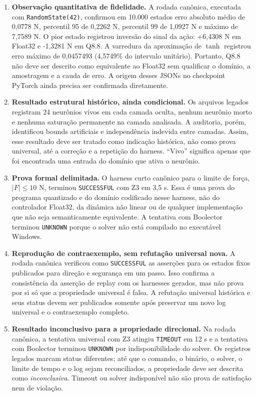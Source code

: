 \begin{enumerate}
  \item \textbf{Observação quantitativa de fidelidade.} A rodada canônica,
  executada com \texttt{RandomState(42)}, confirmou em 10.000 estados erro absoluto
  médio de 0,0778 N, percentil 95 de 0,2262 N, percentil 99 de 1,0927 N e
  máximo de 7,7589 N. O pior estado registrou inversão do sinal da ação:
  +6,4308 N em Float32 e -1,3281 N em Q8.8. A varredura da aproximação de
  $\tanh$ registrou erro máximo de 0,0457493 (4,5749\% do intervalo unitário).
  Portanto, Q8.8 não deve ser descrito como equivalente ao Float32 sem qualificar
  o domínio, a amostragem e a cauda de erro. A origem desses JSONs no checkpoint
  PyTorch ainda precisa ser confirmada diretamente.

  \item \textbf{Resultado estrutural histórico, ainda condicional.} Os arquivos
  legados registram 24 neurônios vivos em cada camada oculta, nenhum neurônio
  morto e nenhuma saturação permanente na camada analisada. A auditoria, porém,
  identificou bounds artificiais e independência indevida entre camadas. Assim,
  esse resultado deve ser tratado como indicação histórica, não como prova
  universal, até a correção e a repetição do harness. “Vivo” significa apenas que
  foi encontrada uma entrada do domínio que ativa o neurônio.

  \item \textbf{Prova formal delimitada.} O harness curto canônico para o limite
  de força, $|F|\leq 10$ N, terminou \texttt{SUCCESSFUL} com Z3 em 3,5 s. Essa
  é uma prova do programa quantizado e do domínio codificado nesse harness,
  não do controlador Float32, da dinâmica não linear ou de qualquer implementação
  que não seja semanticamente equivalente. A tentativa com Boolector terminou
  \texttt{UNKNOWN} porque o solver não está compilado no executável Windows.

  \item \textbf{Reprodução de contraexemplo, sem refutação universal nova.} A
  rodada canônica verificou como \texttt{SUCCESSFUL} as asserções para os estados
  fixos publicados para direção e segurança em um passo. Isso confirma a
  consistência da asserção de replay com os harnesses gerados, mas não prova por
  si só que a propriedade universal é falsa. A refutação universal histórica e
  seus status devem ser publicados somente após preservar um novo log universal
  e o contraexemplo completo.

  \item \textbf{Resultado inconclusivo para a propriedade direcional.} Na rodada
  canônica, a tentativa universal com Z3 atingiu \texttt{TIMEOUT} em 12 s e a
  tentativa com Boolector terminou \texttt{UNKNOWN} por indisponibilidade do
  solver. Os registros legados marcam status diferentes; até que o comando, o
  binário, o solver, o limite de tempo e o log sejam reconciliados, a propriedade
  deve ser descrita como \emph{inconclusiva}. Timeout ou solver indisponível não
  são prova de satisfação nem de violação.


\end{enumerate}

